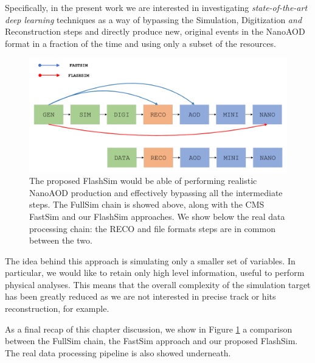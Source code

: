 Specifically, in the present work we are interested in investigating \emph{state-of-the-art deep learning} techniques as a way of bypassing the Simulation, Digitization \emph{and} Reconstruction steps and directly produce new, original events in the NanoAOD format in a fraction of the time and using only a subset of the resources.

\begin{figure}
    \centering
    \includegraphics[width=\columnwidth]{gfx/ch2/sim_comp.pdf}
    \caption[Simulation comparison]{The proposed FlashSim would be able of performing realistic NanoAOD production and effectively bypassing all the intermediate steps. The FullSim chain is showed above, along with the CMS FastSim and our FlashSim approaches. We show below the real data processing chain: the RECO and file formats steps are in common between the two.}
    \label{fig:sim_comp}
\end{figure}

The idea behind this approach is simulating only a smaller set of variables. In particular, we would like to retain only high level information, useful to perform physical analyses. This means that the overall complexity of the simulation target has been greatly reduced as we are not interested in precise track or hits reconstruction, for example.

As a final recap of this chapter discussion, we show in Figure \ref{fig:sim_comp} a comparison between the FullSim chain, the FastSim approach and our proposed FlashSim. The real data processing pipeline is also showed underneath.
